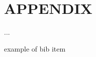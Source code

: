 \documentclass[letterpaper, 10 pt, conference]{ieeeconf}  %
\begin{document}






\section*{APPENDIX}

...



\begin{thebibliography}{99}

 example of bib item 

\end{thebibliography}
\end{document}
